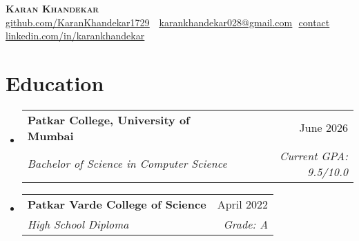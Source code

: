 \documentclass[letterpaper,11pt]{article}
\makeatletter
\newcommand{\resumeSubheading}[4]{
  \vspace{-2pt}\item
    \begin{tabular*}{0.97\textwidth}[t]{l@{\extracolsep{\fill}}r}
      \textbf{#1} & #2 \\
      \textit{\small#3} & \textit{\small #4} \\
    \end{tabular*}\vspace{-7pt}
}
\newcommand{\resumeSubHeadingListStart}{\begin{itemize}[leftmargin=0.15in, label={}]}
\newcommand{\resumeSubHeadingListEnd}{\end{itemize}}
\makeatother
\begin{document}
\begin{flushright}
  \vspace{-4pt}
\end{flushright}

\vspace{-7pt}

\begin{center}
    \textbf{\Huge \scshape Karan Khandekar} \\ \vspace{8pt}
    \small 
    \faGithub
    \href{github.com/KaranKhandekar1729}{\underline{github.com/KaranKhandekar1729}} $  $
    \faEnvelope$  $
    \href{mailto:karankhandekar028@gmail.com}
    {\underline{karankhandekar028@gmail.com}}
    \faPhone$  $
    \underline{contact}
    \faLinkedin$  $
    \href{linkedin.com/in/karankhandekar}{\underline{linkedin.com/in/karankhandekar}} $  $
\end{center}

\section{Education}
  \resumeSubHeadingListStart
    \resumeSubheading
        {Patkar College, University of Mumbai}{June 2026}
        {Bachelor of Science in Computer Science}{Current GPA: 9.5/10.0}
  
    \resumeSubheading
      {Patkar Varde College of Science}{April 2022}
      {High School Diploma}{Grade: A}
      

  \resumeSubHeadingListEnd

\end{document}
